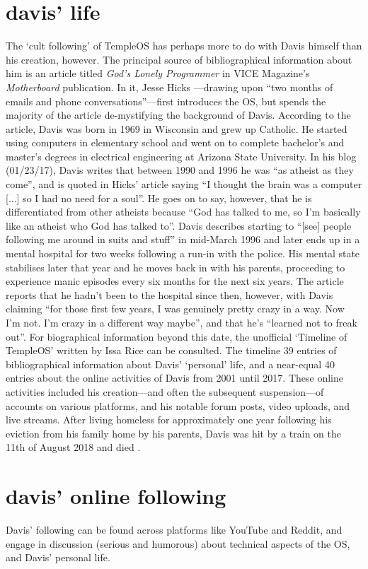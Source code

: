 \documentclass[a4paper]{article}
\begin{document}
\section*{davis' life}
The `cult following' of TempleOS has perhaps
more to do with Davis himself than his creation, however.
The principal source of bibliographical information about him is
an article titled \textit{God’s Lonely Programmer}
in VICE Magazine’s \textit{Motherboard} publication.
In it, Jesse Hicks \parencite*{Hicks14}---drawing
upon ``two months of emails and phone conversations''---first
introduces the OS,
but spends the majority of the article de-mystifying the background of Davis.
According to the article,
Davis was born in 1969 in Wisconsin and grew up Catholic.
He started using computers in elementary school
and went on to complete bachelor's and master's degrees
in electrical engineering at Arizona State University.
In his blog (01/23/17), Davis writes that
between 1990 and 1996 he was ``as atheist as they come'',
and is quoted in Hicks' article saying
``I thought the brain was a computer [...] so I had no need for a soul''.
He goes on to say, however, that he is differentiated from other atheists
because ``God has talked to me,
so I'm basically like an atheist who God has talked to''.
Davis describes starting to
``[see] people following me around in suits and stuff'' in mid-March 1996
and later ends up in a mental hospital for two weeks
following a run-in with the police.
His mental state stabilises later that year
and he moves back in with his parents,
proceeding to experience manic episodes every six months for the next six years.
The article reports that he hadn't been to the hospital since then, however,
with Davis claiming
``for those first few years, I was genuinely pretty crazy in a way.
Now I'm not. I'm crazy in a different way maybe'',
and that he's ``learned not to freak out''.
For biographical information beyond this date,
the unofficial `Timeline of TempleOS' written by Issa Rice
\parencite*{Rice18} can be consulted.
The timeline 39 entries of bibliographical information
about Davis' `personal' life, and a near-equal 40 entries about
the online activities of Davis from 2001 until 2017.
These online activities included his creation---and
often the subsequent suspension---of accounts on various platforms,
and his notable forum posts, video uploads, and live streams.
After living homeless for approximately one year following
his eviction from his family home by his parents,
Davis was hit by a train on the 11th of August 2018 and died \parencite{Cecil18}.

\section*{davis' online following}
Davis' following can be found across platforms like YouTube and Reddit,
and engage in discussion (serious and humorous) about
technical aspects of the OS, and Davis’ personal life.

\printbibliography
\end{document}
